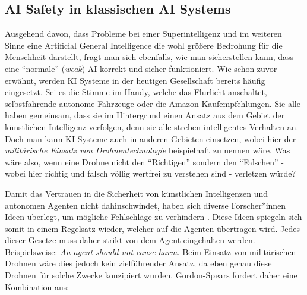         \subsection{AI Safety in klassischen AI Systems}

        Ausgehend davon, dass Probleme bei einer Superintelligenz und im weiteren Sinne eine Artificial General
        Intelligence die wohl größere Bedrohung für die Menschheit darstellt, fragt man sich ebenfalls, wie man
        sicherstellen kann, dass eine ``normale'' (\textit{weak}) AI korrekt und sicher funktioniert. Wie schon
        zuvor erwähnt, werden KI Systeme in der heutigen Gesellschaft bereits häufig eingesetzt. Sei es die
        Stimme im Handy, welche das Flurlicht anschaltet, selbstfahrende autonome Fahrzeuge oder die Amazon
        Kaufempfehlungen. Sie alle haben gemeinsam, dass sie im Hintergrund einen Ansatz aus dem Gebiet der künstlichen
        Intelligenz verfolgen, denn sie alle streben intelligentes Verhalten an. Doch man kann KI-Systeme auch in
        anderen Gebieten einsetzen, wobei hier der \textit{militärische Einsatz von Drohnentechnologie} beispielhaft
        zu nennen wäre. \cite[s. 251]{Stulpe2018} Was wäre also, wenn eine Drohne nicht den ``Richtigen'' sondern den
        ``Falschen'' - wobei hier richtig und falsch völlig wertfrei zu verstehen sind - verletzen würde?

        Damit das Vertrauen in die Sicherheit von künstlichen Intelligenzen und autonomen Agenten nicht dahinschwindet,
        haben sich diverse Forscher*innen Ideen überlegt, um mögliche Fehlschläge zu verhindern \cite[s. 257]{GordonSpears2003}.
        Diese Ideen spiegeln sich somit in einem Regelsatz wieder, welcher auf die Agenten übertragen wird. Jedes dieser
        Gesetze muss daher strikt von dem Agent eingehalten werden. Beispielsweise:
        \textit{An agent should not cause harm.} Beim Einsatz von militärischen Drohnen wäre dies jedoch kein
        zielführender Ansatz, da eben genau diese Drohnen für solche Zwecke konzipiert wurden. Gordon-Spears fordert daher
        eine Kombination aus:

